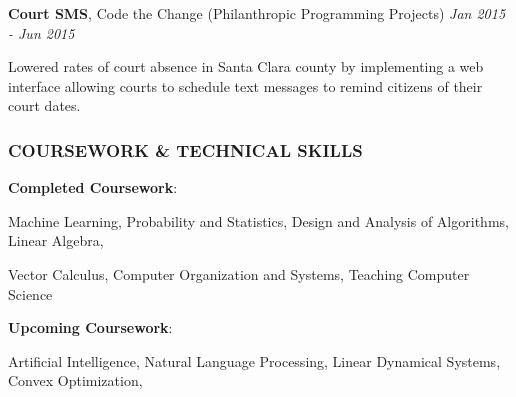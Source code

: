 \documentclass[11pt,letterpaper]{article}%
\begin{document}
\vspace{-.3em}
\hspace{.6em}  
{\bf Court SMS}, Code the Change (Philanthropic Programming Projects) \hfill \textit{Jan 2015 - Jun 2015}
\vspace{-.4em}
\begin{itemize*}
\item Lowered rates of court absence in Santa Clara county by implementing a web interface allowing courts to schedule text messages to remind citizens of their court dates.
\end{itemize*}


\vspace{-.2em}
\subsubsection*{COURSEWORK \& TECHNICAL SKILLS}
\vspace{-2ex}
\hrulefill

\hspace{.6em} 
{\bf Completed Coursework}: 

\hspace{2.4em}
Machine Learning,
Probability and Statistics, 
Design and Analysis of Algorithms, 
Linear Algebra,

\hspace{2.4em}
Vector Calculus,
Computer Organization and Systems, 
Teaching Computer Science

\hspace{.6em}
{\bf Upcoming Coursework}:

\hspace{2.4em}
Artificial Intelligence, 
Natural Language Processing,
Linear Dynamical Systems,
Convex Optimization,
\end{document}
